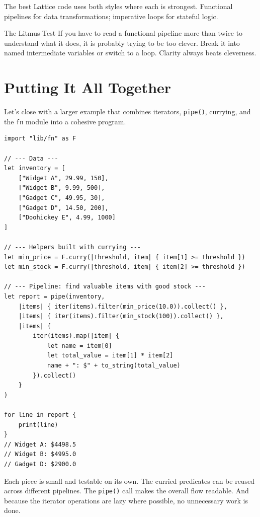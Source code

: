 The best Lattice code uses both styles where each is strongest.
Functional pipelines for data transformations; imperative loops for stateful logic.

\begin{tipbox}{The Litmus Test}
If you have to read a functional pipeline more than twice to understand what it does, it is probably trying to be too clever.
Break it into named intermediate variables or switch to a loop.
Clarity always beats cleverness.
\end{tipbox}

\section{Putting It All Together}\label{sec:fp-putting-together}

Let's close with a larger example that combines iterators, \lstinline|pipe()|, currying, and the \lstinline|fn| module into a cohesive program.

\begin{lstlisting}[language=Lattice, caption={A complete functional example}]
import "lib/fn" as F

// --- Data ---
let inventory = [
    ["Widget A", 29.99, 150],
    ["Widget B", 9.99, 500],
    ["Gadget C", 49.95, 30],
    ["Gadget D", 14.50, 200],
    ["Doohickey E", 4.99, 1000]
]

// --- Helpers built with currying ---
let min_price = F.curry(|threshold, item| { item[1] >= threshold })
let min_stock = F.curry(|threshold, item| { item[2] >= threshold })

// --- Pipeline: find valuable items with good stock ---
let report = pipe(inventory,
    |items| { iter(items).filter(min_price(10.0)).collect() },
    |items| { iter(items).filter(min_stock(100)).collect() },
    |items| {
        iter(items).map(|item| {
            let name = item[0]
            let total_value = item[1] * item[2]
            name + ": $" + to_string(total_value)
        }).collect()
    }
)

for line in report {
    print(line)
}
// Widget A: $4498.5
// Widget B: $4995.0
// Gadget D: $2900.0
\end{lstlisting}

Each piece is small and testable on its own.
The curried predicates can be reused across different pipelines.
The \lstinline|pipe()| call makes the overall flow readable.
And because the iterator operations are lazy where possible, no unnecessary work is done.


